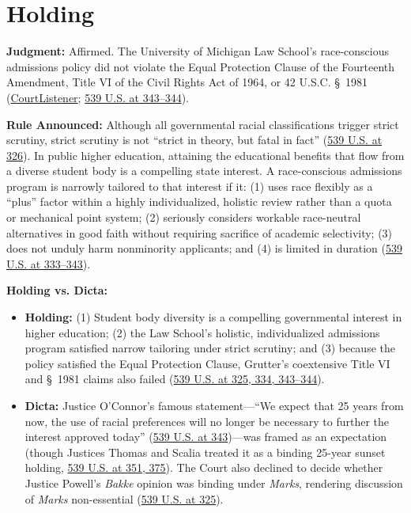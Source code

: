 \documentclass[12pt]{article}
\begin{document}
\section{Holding}
\textbf{Judgment:} Affirmed. The University of Michigan Law School's race-conscious admissions policy did not violate the Equal Protection Clause of the Fourteenth Amendment, Title VI of the Civil Rights Act of 1964, or 42 U.S.C. \S~1981 (\href{https://www.courtlistener.com/opinion/130155/grutter-v-bollinger/}{CourtListener}; \href{https://supreme.justia.com/cases/federal/us/539/306/}{539 U.S. at 343--344}).

\textbf{Rule Announced:} Although all governmental racial classifications trigger strict scrutiny, strict scrutiny is not ``strict in theory, but fatal in fact'' (\href{https://supreme.justia.com/cases/federal/us/539/306/}{539 U.S. at 326}). In public higher education, attaining the educational benefits that flow from a diverse student body is a compelling state interest. A race-conscious admissions program is narrowly tailored to that interest if it: (1) uses race flexibly as a ``plus'' factor within a highly individualized, holistic review rather than a quota or mechanical point system; (2) seriously considers workable race-neutral alternatives in good faith without requiring sacrifice of academic selectivity; (3) does not unduly harm nonminority applicants; and (4) is limited in duration (\href{https://supreme.justia.com/cases/federal/us/539/306/}{539 U.S. at 333--343}).

\textbf{Holding vs. Dicta:}
\begin{itemize}
    \item \textbf{Holding:} (1) Student body diversity is a compelling governmental interest in higher education; (2) the Law School's holistic, individualized admissions program satisfied narrow tailoring under strict scrutiny; and (3) because the policy satisfied the Equal Protection Clause, Grutter's coextensive Title VI and \S~1981 claims also failed (\href{https://supreme.justia.com/cases/federal/us/539/306/}{539 U.S. at 325, 334, 343--344}).
    \item \textbf{Dicta:} Justice O'Connor's famous statement---``We expect that 25 years from now, the use of racial preferences will no longer be necessary to further the interest approved today'' (\href{https://supreme.justia.com/cases/federal/us/539/306/}{539 U.S. at 343})---was framed as an expectation (though Justices Thomas and Scalia treated it as a binding 25-year sunset holding, \href{https://supreme.justia.com/cases/federal/us/539/306/}{539 U.S. at 351, 375}). The Court also declined to decide whether Justice Powell's \textit{Bakke} opinion was binding under \textit{Marks}, rendering discussion of \textit{Marks} non-essential (\href{https://supreme.justia.com/cases/federal/us/539/306/}{539 U.S. at 325}).
\end{itemize}
\end{document}
